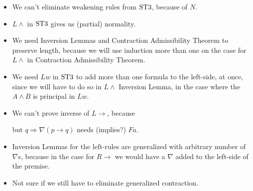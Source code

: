 \documentclass[a4paper, 12pt]{paper}
\begin{document}
\begin{itemize}
  \item We can't eliminate weakening rules from $\stt$, because of $N$.

  \item $L \wedge$ in $\stt$ gives us (partial) normality.
  
  \item We need Inversion Lemmas and Contraction Admissibility Theorem to preserve length, because we will use induction more than one on the case for $L \wedge$ in Contraction Admissibility Theorem.
  
  \item We need $Lw$ in $\stt$ to add more than one formula to the left-side, at once, since we will have to do so in $L \wedge$ Inversion Lemma, in the case where the $A \wedge B$ is principal in $Lw$.
  
  \item We can't prove inverse of $L \rightarrow$, because
  \begin{prooftree}
  \end{prooftree}
  but $q \Rightarrow \nabla (p \rightarrow q)$ needs (implies?) $Fa$.

  \item Inversion Lemmas for the left-rules are generalized with arbitrary number of $\nabla$s, because in the case for $R \rightarrow$ we would have a $\nabla$ added to the left-side of the premise.
  
  \item Not sure if we still have to eliminate generalized contraction.
  
\end{itemize}
\end{document}
